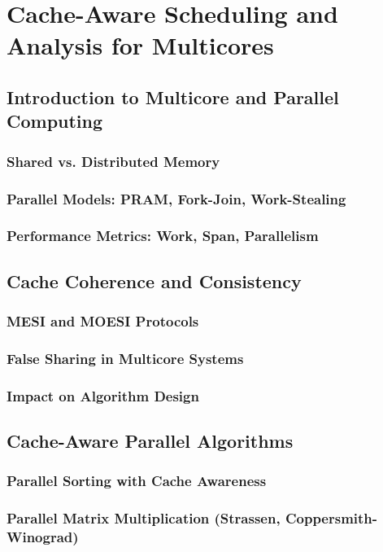 
\chapter{Cache-Aware Scheduling and Analysis for Multicores}
\section{Introduction to Multicore and Parallel Computing}
\subsection{Shared vs. Distributed Memory}
\subsection{Parallel Models: PRAM, Fork-Join, Work-Stealing}
\subsection{Performance Metrics: Work, Span, Parallelism}

\section{Cache Coherence and Consistency}
\subsection{MESI and MOESI Protocols}
\subsection{False Sharing in Multicore Systems}
\subsection{Impact on Algorithm Design}

\section{Cache-Aware Parallel Algorithms}
\subsection{Parallel Sorting with Cache Awareness}
\subsection{Parallel Matrix Multiplication (Strassen, Coppersmith-Winograd)}
